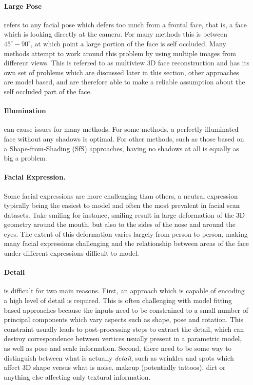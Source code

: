 \paragraph{Large Pose} refers to any facial pose which defers too much
from a frontal face, that is, a face which is looking directly at the
camera. For many methods this is between $45^\circ - 90^\circ$, at
which point a large portion of the face is self occluded. Many methods
attempt to work around this problem by using multiple images from
different views. This is referred to as multiview 3D face
reconstruction and has its own set of problems which are discussed
later in this section, other approaches are model based, and are
therefore able to make a reliable assumption about the self occluded
part of the face.

\paragraph{Illumination} can cause issues for many methods. For some
methods, a perfectly illuminated face without any shadows is
optimal. For other methods, such as those based on a
Shape-from-Shading (SfS) approaches, having no shadows at all is
equally as big a problem.

\paragraph{Facial Expression.} Some facial expressions are more
challenging than others, a neutral expression typically being the
easiest to model and often the most prevalent in facial scan
datasets. Take smiling for instance, smiling result in large
deformation of the 3D geometry around the mouth, but also to the sides
of the nose and around the eyes. The extent of this deformation varies
largely from person to person, making many facial expressions
challenging and the relationship between areas of the face under
different expressions difficult to model.

\paragraph{Detail} is difficult for two main reasons. First, an
approach which is capable of encoding a high level of detail is
required. This is often challenging with model fitting based
approaches because the inputs need to be constrained to a small number
of principal components which vary aspects such as shape, pose and
rotation. This constraint usually leads to post-processing steps to
extract the detail, which can destroy correspondence between vertices
usually present in a parametric model, as well as pose and scale
information. Second, there need to be some way to distinguish between
what is actually \textit{detail}, such as wrinkles and spots which
affect 3D shape versus what is noise, makeup (potentially tattoos),
dirt or anything else affecting only textural information.


